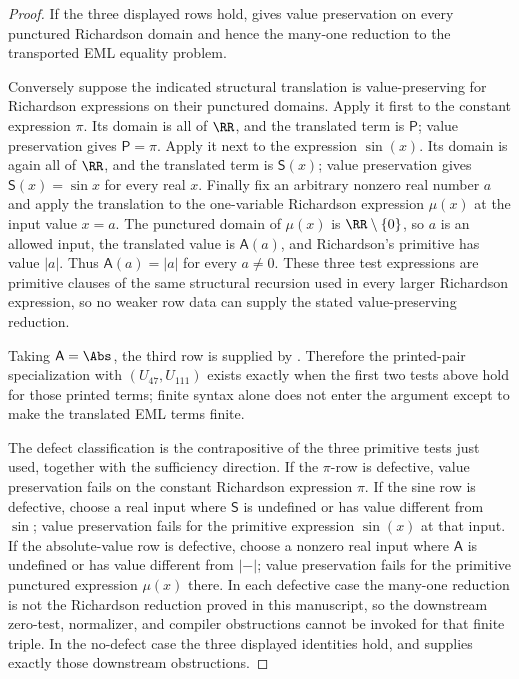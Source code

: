 \begin{proof}
If the three displayed rows hold, 
gives value preservation on every punctured Richardson domain and hence the
many-one reduction to the transported EML equality problem.

Conversely suppose the indicated structural translation is value-preserving for
Richardson expressions on their punctured domains.  Apply it first to the
constant expression \(\pi\).  Its domain is all of \(\RR\), and the translated
term is \(\mathsf P\); value preservation gives \(\mathsf P=\pi\).  Apply it next
to the expression \(\sin(x)\).  Its domain is again all of \(\RR\), and the
translated term is \(\mathsf S(x)\); value preservation gives
\(\mathsf S(x)=\sin x\) for every real \(x\).  Finally fix an arbitrary nonzero
  real number \(a\) and apply the translation to the one-variable Richardson
  expression \(\mu(x)\) at the input value \(x=a\).  The punctured domain of
  \(\mu(x)\) is \(\RR\setminus\{0\}\), so \(a\) is an allowed input, the translated value is
\(\mathsf A(a)\), and Richardson's primitive has value \(|a|\).  Thus
\(\mathsf A(a)=|a|\) for every \(a\ne0\).  These three test expressions are
primitive clauses of the same structural recursion used in every larger
Richardson expression, so no weaker row data can supply the stated
value-preserving reduction.

Taking \(\mathsf A=\Abs\), the third row is supplied by
.  Therefore the printed-pair
specialization with \((U_{47},U_{111})\) exists exactly when the first two tests
above hold for those printed terms; finite syntax alone does not enter the
argument except to make the translated EML terms finite.

The defect classification is the contrapositive of the three primitive tests
just used, together with the sufficiency direction.  If the \(\pi\)-row is
defective, value preservation fails on the constant Richardson expression
\(\pi\).  If the sine row is defective, choose a real input where
\(\mathsf S\) is undefined or has value different from \(\sin\); value
preservation fails for the primitive expression \(\sin(x)\) at that input.  If
the absolute-value row is defective, choose a nonzero real input where
\(\mathsf A\) is undefined or has value different from \(|-|\); value
preservation fails for the primitive punctured expression \(\mu(x)\) there.  In
each defective case the many-one reduction is not the Richardson reduction
proved in this manuscript, so the downstream zero-test, normalizer, and compiler
obstructions cannot be invoked for that finite triple.  In the no-defect case
the three displayed identities hold, and  supplies exactly
those downstream obstructions.
\end{proof}

